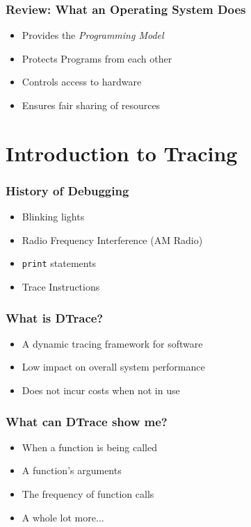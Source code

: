 \documentclass[pdftex]{beamer} %
\begin{document}
\begin{frame}
  \frametitle{Review: What an Operating System Does}
  \begin{itemize}
  \item Provides the \emph{Programming Model}
  \item Protects Programs from each other
  \item Controls access to hardware
  \item Ensures fair sharing of resources
  \end{itemize}
\end{frame}

\section{Introduction to Tracing}
\label{sec:intro-tracing}

\begin{frame}[fragile]
  \frametitle{History of Debugging}
  \begin{itemize}
  \item Blinking lights
  \item Radio Frequency Interference (AM Radio)
  \item \verb|print| statements
  \item Trace Instructions
  \end{itemize}
\end{frame}

\begin{frame}
  \frametitle{What is DTrace?}
  \begin{itemize}
  \item A dynamic tracing framework for software
  \item Low impact on overall system performance
  \item Does not incur costs when not in use
  \end{itemize}
\end{frame}

\begin{frame}
  \frametitle{What can DTrace show me?}
  \begin{itemize}
  \item When a function is being called
  \item A function's arguments
  \item The frequency of function calls
  \item A whole lot more...
  \end{itemize}
\end{frame}
\end{document}
